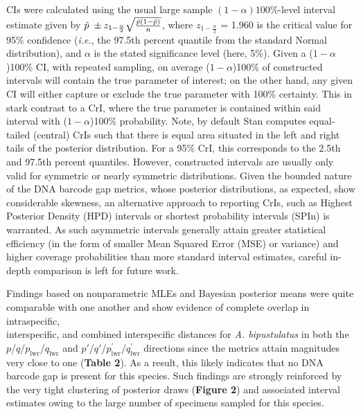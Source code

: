 \documentclass[12pt]{article}
\begin{document}
\noindent  CIs were calculated using the usual large sample  $(1-\alpha)100\%$-level interval estimate given by $\hat{p} \hspace{1mm} \pm z_{1 - \frac{\alpha}{2}}\sqrt{\frac{\hat{p}(1 - \hat{p})}{n}}$, where $z_{1 - \frac{\alpha}{2}}$ = 1.960 is the critical value for 95\% confidence (\textit{i.e.}, the 97.5th percent quantile from the standard Normal distribution), and $\alpha$ is the stated significance level (here, 5\%). Given a ($1 - \alpha$)100\% CI, with repeated sampling, on average ($1 - \alpha$)100\% of constructed intervals will contain the true parameter of interest; on the other hand, any given CI will either capture or exclude the true parameter with 100\% certainty. This in stark contrast to a CrI, where the true parameter is contained within said interval with ($1 - \alpha$)100\% probability. Note, by default Stan computes equal-tailed (central) CrIs such that there is equal area situated in the left and right tails of the posterior distribution. For a 95\% CrI, this corresponds to the 2.5th and 97.5th percent quantiles. However, constructed intervals are usually only valid for symmetric or nearly symmetric distributions. Given the bounded nature of the DNA barcode gap metrics, whose posterior distributions, as expected, show considerable skewness, an alternative approach to reporting CrIs, such as Highest Posterior Density (HPD) intervals \citep{chen1999monte} or shortest probability intervals (SPIn) \citep{liu2015simulation} is warranted. As such asymmetric intervals generally attain greater statistical efficiency (in the form of smaller Mean Squared Error (MSE) or variance) and higher coverage probabilities than more standard interval estimates, careful in-depth comparison is left for future work. 

Findings based on nonparametric MLEs and Bayesian posterior means were quite \\ comparable with one another and show evidence of complete overlap in intraspecific, \\ interspecific, and combined interspecific distances for \textit{A. bipustulatus} in both the $p$/$q$/$p_{\mathrm{lwr}}$/$q_{\mathrm{lwr}}$ and $p'$/$q'$/$p^{'}_{\mathrm{lwr}}$/$q^{'}_{\mathrm{lwr}}$ directions since the metrics attain magnitudes very close to one (\textbf{Table 2}). As a result, this likely indicates that no DNA barcode gap is present for this species. Such findings are strongly reinforced by the very tight clustering of posterior draws (\textbf{Figure 2}) and associated interval estimates owing to the large number of specimens sampled for this species.
\end{document}
